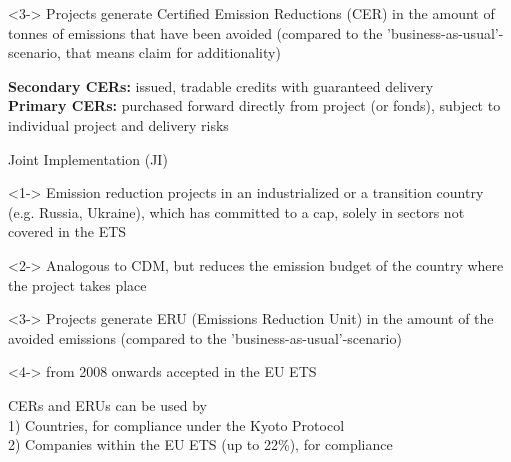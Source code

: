 	<3-> Projects generate Certified Emission Reductions (CER) in the amount of tonnes of emissions that have been avoided (compared to the 'business-as-usual'-scenario, that means claim for additionality)




\textbf{Secondary CERs:} issued, tradable credits with guaranteed delivery \\
\textbf{Primary CERs:} purchased forward directly from project (or fonds), subject to individual project and delivery risks


{Joint Implementation (JI)}






	<1-> Emission reduction projects in an industrialized or a transition country (e.g. Russia, Ukraine), which has committed to a cap, solely in sectors not covered in the ETS


	<2-> Analogous to CDM, but reduces the emission budget of the country where the project takes place


	<3-> Projects generate ERU (Emissions Reduction Unit) in the amount of the avoided emissions (compared to the 'business-as-usual'-scenario)


	<4-> from 2008 onwards accepted in the EU ETS




CERs and ERUs can be used by \\
1) Countries, for compliance under the Kyoto Protocol \\
2) Companies within the EU ETS (up to 22\%), for compliance


